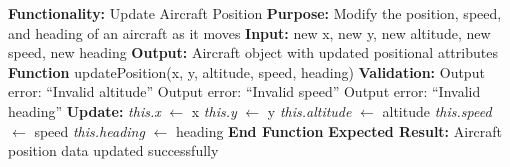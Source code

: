 \documentclass[a4paper,11pt]{article}
\begin{document}
\begin{algorithm}
\caption{Update Aircraft Position}
\begin{algorithmic}[1]
\State \textbf{Functionality:} Update Aircraft Position
\State \textbf{Purpose:} Modify the position, speed, and heading of an aircraft as it moves
\State \textbf{Input:} new x, new y, new altitude, new speed, new heading
\State \textbf{Output:} Aircraft object with updated positional attributes
\vspace{0.3cm}
\State \textbf{Function} updatePosition(x, y, altitude, speed, heading)
\State \hspace{1cm} \textbf{Validation:}
\State \hspace{1.5cm}  Output error: ``Invalid altitude'' \EndIf
\State \hspace{1.5cm}  Output error: ``Invalid speed'' \EndIf
\State \hspace{1.5cm}  Output error: ``Invalid heading'' \EndIf
\State \hspace{1cm} \textbf{Update:}
\State \hspace{1.5cm} \textit{this.x} $\leftarrow$ x
\State \hspace{1.5cm} \textit{this.y} $\leftarrow$ y
\State \hspace{1.5cm} \textit{this.altitude} $\leftarrow$ altitude
\State \hspace{1.5cm} \textit{this.speed} $\leftarrow$ speed
\State \hspace{1.5cm} \textit{this.heading} $\leftarrow$ heading
\State \textbf{End Function}
\State \textbf{Expected Result:} Aircraft position data updated successfully
\end{algorithmic}
\end{algorithm}
\end{document}
